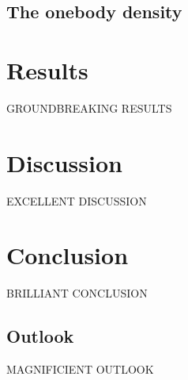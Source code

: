 \documentclass[a4paper, 10pt]{article}
\begin{document}
	\subsection{The onebody density}
 	\section{Results}
	GROUNDBREAKING RESULTS
	\section{Discussion}
	EXCELLENT DISCUSSION
	\section{Conclusion}
	BRILLIANT CONCLUSION
	\subsection{Outlook}
	MAGNIFICIENT OUTLOOK
	
	
	\pagebreak
\end{document}
